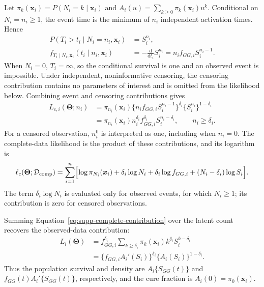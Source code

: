 \documentclass[11pt]{article}
\begin{document}
Let $\pi_k(\bm{x}_i)=P(N_i=k\mid\bm{x}_i)$ and
$A_i(u)=\sum_{k\geq0}\pi_k(\bm{x}_i)u^k$. Conditional on
$N_i=n_i\geq1$, the event time is the minimum of $n_i$
independent activation times. Hence
\begin{equation}
\begin{aligned}
P(T_i>t_i\mid N_i=n_i,\bm{x}_i)&=S_i^{n_i},\\
f_{T_i\mid N_i,\bm{x}_i}(t_i\mid n_i,\bm{x}_i)
&=-\frac{\mathrm d}{\mathrm dt_i}S_i^{n_i}
=n_i f_{GG,i}S_i^{n_i-1}.
\end{aligned}
\label{eq:supp-conditional-event-time}
\end{equation}
When $N_i=0$, $T_i=\infty$, so the conditional survival is
one and an observed event is impossible. Under independent,
noninformative censoring, the censoring contribution contains
no parameters of interest and is omitted from the likelihood
below. Combining event and censoring contributions gives
\begin{equation}
\begin{aligned}
L_{c,i}(\bm\Theta;n_i)
&=\pi_{n_i}(\bm{x}_i)
\{n_i f_{GG,i}S_i^{n_i-1}\}^{\delta_i}
\{S_i^{n_i}\}^{1-\delta_i}\\
&=\pi_{n_i}(\bm{x}_i)n_i^{\delta_i}
f_{GG,i}^{\delta_i}S_i^{n_i-\delta_i},
\qquad n_i\geq\delta_i.
\end{aligned}
\label{eq:supp-complete-contribution}
\end{equation}
For a censored observation, $n_i^{0}$ is interpreted as one,
including when $n_i=0$. The complete-data likelihood is the
product of these contributions, and its logarithm is
\begin{equation}
\ell_c(\bm\Theta;\mathcal D_{\mathrm{comp}})
=\sum_{i=1}^{n}\Bigl[
\log\pi_{N_i}(\bm{x}_i)+\delta_i\log N_i
+\delta_i\log f_{GG,i}+(N_i-\delta_i)\log S_i
\Bigr].
\label{eq:supp-generic-complete-loglikelihood}
\end{equation}
The term $\delta_i\log N_i$ is evaluated only for observed
events, for which $N_i\geq1$; its contribution is zero for
censored observations.

Summing Equation~\eqref{eq:supp-complete-contribution} over
the latent count recovers the observed-data contribution:
\begin{equation}
\begin{aligned}
L_i(\bm\Theta)
&=f_{GG,i}^{\delta_i}
\sum_{k\geq\delta_i}\pi_k(\bm{x}_i)k^{\delta_i}S_i^{k-\delta_i}\\
&=\{f_{GG,i}A_i'(S_i)\}^{\delta_i}
\{A_i(S_i)\}^{1-\delta_i}.
\end{aligned}
\label{eq:supp-observed-contribution}
\end{equation}
Thus the population survival and density are $A_i\{S_{GG}(t)\}$ and $f_{GG}(t)A_i'\{S_{GG}(t)\}$, respectively, and the cure fraction is $A_i(0)=\pi_0(\bm{x}_i)$.
\end{document}
